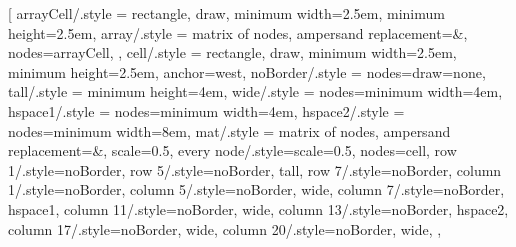 \centeredTikzFigure[
  arrayCell/.style = {rectangle, draw, minimum width=2.5em, minimum height=2.5em},
  array/.style = {
    matrix of nodes,
    ampersand replacement=\&,
    nodes=arrayCell,
  },
  cell/.style = {rectangle, draw, minimum width=2.5em, minimum height=2.5em, anchor=west},
  noBorder/.style = {nodes={draw=none}},
  tall/.style = {minimum height=4em},
  wide/.style = {nodes={minimum width=4em}},
  hspace1/.style = {nodes={minimum width=4em}},
  hspace2/.style = {nodes={minimum width=8em}},
  mat/.style = {
    matrix of nodes,
    ampersand replacement=\&,
    scale=0.5,
    every node/.style={scale=0.5},
    nodes=cell,
    row 1/.style=noBorder,
    row 5/.style={noBorder, tall},
    row 7/.style=noBorder,
    column 1/.style=noBorder,
    column 5/.style={noBorder, wide},
    column 7/.style={noBorder, hspace1},
    column 11/.style={noBorder, wide},
    column 13/.style={noBorder, hspace2},
    column 17/.style={noBorder, wide},
    column 20/.style={noBorder, wide},
  },
